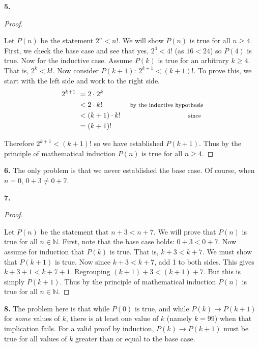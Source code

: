 \documentclass[10pt,]{book}
\theoremstyle{plain}
\theoremstyle{definition}
\theoremstyle{definition}
\theoremstyle{definition}
\numberwithin{equation}{chapter}
\def\N{\mathbb N}
\def\imp{\rightarrow}
\newcommand{\lt}{ < }
\newcommand{\amp}{ & }
\begin{document}
\par\smallskip
\noindent\textbf{5.}\quad{}\begin{proof}\hypertarget{proof-23}{}

Let \(P(n)\) be the statement \(2^n \lt  n!\). We will show \(P(n)\) is true for all \(n \ge 4\). First, we check the base case and see that yes, \(2^4 \lt  4!\) (as \(16 \lt  24\)) so \(P(4)\) is true. Now for the inductive case. Assume \(P(k)\) is true for an arbitrary \(k \ge 4\). That is, \(2^k \lt  k!\). Now consider \(P(k+1)\): \(2^{k+1} \lt  (k+1)!\). To prove this, we start with the left side and work to the right side.
\begin{align*}
  2^{k+1}~ \amp  = 2\cdot 2^k \amp\\
  \amp  \lt  2\cdot k! \amp  \mbox{ \footnotesize by the inductive hypothesis}\\
  \amp  \lt  (k+1) \cdot k! \amp  \mbox{ \footnotesize since }\\
  \amp  = (k+1)! \amp
\end{align*}
%
\par

Therefore \(2^{k+1} \lt  (k+1)!\) so we have established \(P(k+1)\). Thus by the principle of mathematical induction \(P(n)\) is true for all \(n \ge 4\).
%
\end{proof}
\par\smallskip
\noindent\textbf{6.}\quad{}
The only problem is that we never established the base case. Of course, when \(n = 0\), \(0+3 \ne 0+7\).
%
\par\smallskip
\noindent\textbf{7.}\quad{}\begin{proof}\hypertarget{proof-25}{}

Let \(P(n)\) be the statement that \(n + 3 \lt  n + 7\). We will prove that \(P(n)\) is true for all \(n \in \N\). First, note that the base case holds: \(0+3 \lt  0+7\). Now assume for induction that \(P(k)\) is true. That is, \(k+3 \lt  k+7\). We must show that \(P(k+1)\) is true. Now since \(k + 3 \lt  k + 7\), add 1 to both sides. This gives \(k + 3 + 1 \lt  k + 7 + 1\). Regrouping \((k+1) + 3 \lt  (k+1) + 7\). But this is simply \(P(k+1)\). Thus by the principle of mathematical induction \(P(n)\) is true for all \(n \in \N\).
%
\end{proof}
\par\smallskip
\noindent\textbf{8.}\quad{}
The problem here is that while \(P(0)\) is true, and while \(P(k) \imp P(k+1)\) for \emph{some} values of \(k\), there is at least one value of \(k\) (namely \(k = 99\)) when that implication fails. For a valid proof by induction, \(P(k) \imp P(k+1)\) must be true for all values of \(k\) greater than or equal to the base case.
\end{document}
